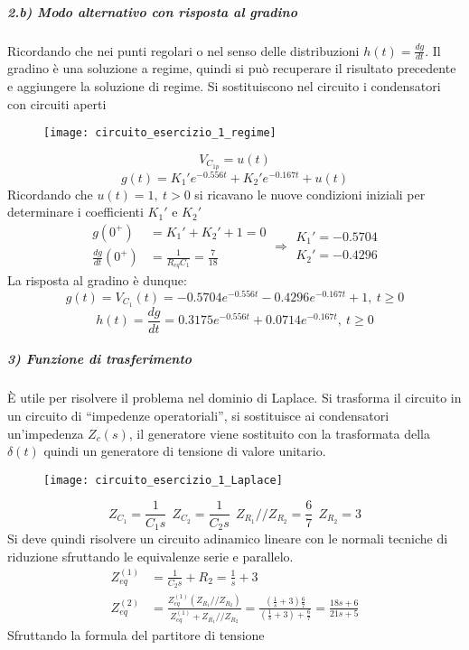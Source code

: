 \subparagraph{2.b) Modo alternativo con risposta al gradino}
Ricordando che nei punti regolari o nel senso delle distribuzioni $h(t) = \frac{dg}{dt}$.
Il gradino è una soluzione a regime, quindi si può recuperare il risultato precedente
e aggiungere la soluzione di regime.
Si sostituiscono nel circuito i condensatori con circuiti aperti
\begin{figure}[H]
\centering
\texttt{[image: circuito\_esercizio\_1\_regime]}
\end{figure}
$$
V_{C_{1p}} = u(t)
$$
$$
g(t) = K_1'e^{-0.556t} + K_2'e^{-0.167 t} + u(t)
$$
Ricordando che $u(t)=1,\ t>0$ si ricavano le nuove condizioni iniziali per determinare
i coefficienti $K_1'$ e $K_2'$
$$
\begin{aligned}
g(0^+) &= K_1' + K_2' + 1 = 0\\
\frac{dg}{dt}(0^+) &= \frac{1}{R_{eq}C_1} = \frac{7}{18}
\end{aligned}
\Rightarrow
\begin{aligned}
K_1' = -0.5704 \\
K_2' = -0.4296
\end{aligned}
$$
La risposta al gradino è dunque:
$$
g(t) = V_{C_1}(t) = -0.5704 e^{-0.556t} - 0.4296e^{-0.167t} + 1,\ t\geq 0
$$
$$
h(t) = \frac{dg}{dt} = 0.3175e^{-0.556t}+0.0714e^{-0.167 t},\ t\geq 0
$$
\newpage
\subparagraph{3) Funzione di trasferimento}
È utile per risolvere il problema nel dominio di Laplace.
Si trasforma il circuito in un circuito di ``impedenze operatoriali'',
si sostituisce ai condensatori un'impedenza $Z_c(s)$, il generatore viene sostituito
con la trasformata della $\delta(t)$ quindi un generatore di tensione di valore unitario.
\begin{figure}[H]
\centering
\texttt{[image: circuito\_esercizio\_1\_Laplace]}
\end{figure}
$$
Z_{C_1} = \frac{1}{C_1s}\ \ Z_{C_2} = \frac{1}{C_2s}\ \ Z_{R_1}//Z_{R_2} = \frac{6}{7}\ \ Z_{R_2} = 3
$$
Si deve quindi risolvere un circuito adinamico lineare con le normali tecniche di riduzione
sfruttando le equivalenze serie e parallelo.
$$
\begin{aligned}
Z_{eq}^{(1)} &= \frac{1}{C_2s} + R_2 = \frac{1}{s} + 3 \\
Z_{eq}^{(2)} & = \frac{Z_{eq}^{(1)}(Z_{R_1}//Z_{R_2})}{Z_{eq}^{(1)}+Z_{R_1}//Z_{R_2}} = 
\frac{\left(\frac{1}{s}+3\right)\frac{6}{7}}{\left(\frac{1}{s}+3\right)+\frac{6}{7}} =
\frac{18s + 6}{21s + 5}
\end{aligned}
$$
Sfruttando la formula del partitore di tensione
